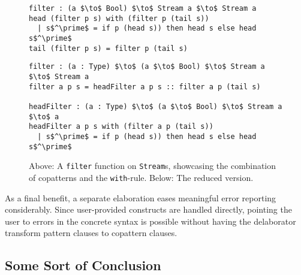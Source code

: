 \begin{figure}[h]
\begin{lstlisting}[mathescape,title=\idrisBlock]
filter : (a $\to$ Bool) $\to$ Stream a $\to$ Stream a
head (filter p s) with (filter p (tail s))
  | s$^\prime$ = if p (head s)) then head s else head s$^\prime$
tail (filter p s) = filter p (tail s)
\end{lstlisting}

\begin{lstlisting}[mathescape,title=\ttBlock]
filter : (a : Type) $\to$ (a $\to$ Bool) $\to$ Stream a $\to$ Stream a
filter a p s = headFilter a p s :: filter a p (tail s)

headFilter : (a : Type) $\to$ (a $\to$ Bool) $\to$ Stream a $\to$ a
headFilter a p s with (filter a p (tail s))
  | s$^\prime$ = if p (head s)) then head s else head s$^\prime$
\end{lstlisting}
  \caption{Above: A \texttt{filter} function on \texttt{Stream}s, showcasing the
    combination of copatterns and the \texttt{with}-rule. Below: The reduced
    version.}
\label{fig:copatterns_with_rule}
\end{figure}

As a final benefit, a separate elaboration eases meaningful error reporting
considerably. Since user-provided constructs are handled directly, pointing the
user to errors in the concrete syntax is possible without having the delaborator
transform pattern clauses to copattern clauses.

\subsection{Some Sort of Conclusion}

